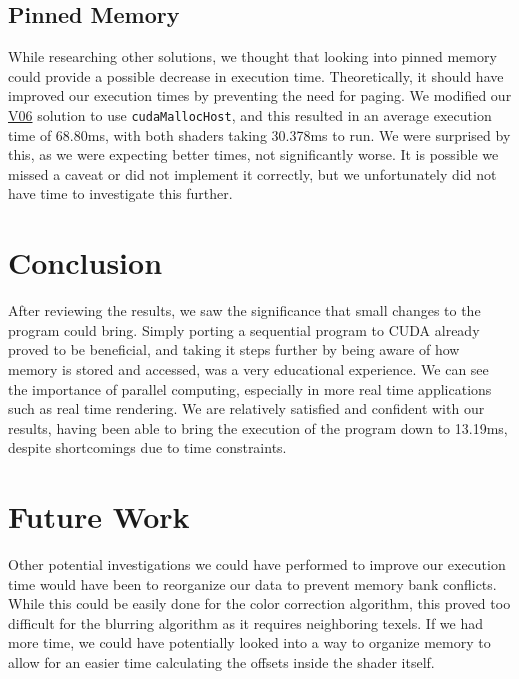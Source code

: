 \documentclass[10pt,journal,compsoc]{IEEEtran}
\def\code#1{\texttt{#1}}
\begin{document}
\subsection{Pinned Memory}

\noindent While researching other solutions, we thought that looking into pinned memory could provide a possible decrease in execution time. Theoretically, it should have improved our execution times by preventing the need for paging. We modified our \hyperref[sec:V06]{V06} solution to use \code{cudaMallocHost}, and this resulted in an average execution time of 68.80ms, with both shaders taking 30.378ms to run. We were surprised by this, as we were expecting better times, not significantly worse. It is possible we missed a caveat or did not implement it correctly, but we unfortunately did not have time to investigate this further.


\section{Conclusion}

\noindent After reviewing the results, we saw the significance that small changes to the program could bring. Simply porting a sequential program to CUDA already proved to be beneficial, and taking it steps further by being aware of how memory is stored and accessed, was a very educational experience. We can see the importance of parallel computing, especially in more real time applications such as real time rendering. We are relatively satisfied and confident with our results, having been able to bring the execution of the program down to 13.19ms, despite shortcomings due to time constraints. 


\section{Future Work}

\noindent Other potential investigations we could have performed to improve our execution time would have been to reorganize our data to prevent memory bank conflicts. While this could be easily done for the color correction algorithm, this proved too difficult for the blurring algorithm as it requires neighboring texels. If we had more time, we could have potentially looked into a way to organize memory to allow for an easier time calculating the offsets inside the shader itself.


\printbibliography
\end{document}
